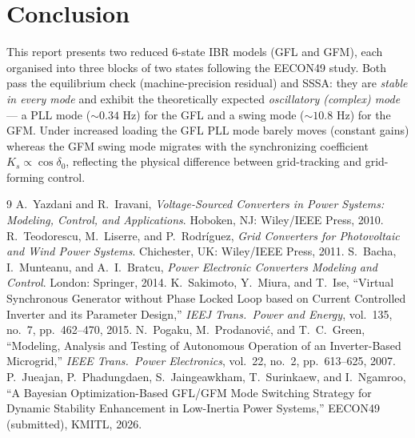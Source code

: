 \documentclass[12pt,a4paper]{article}
\begin{document}
\section{Conclusion}

This report presents two reduced 6-state IBR models (GFL and GFM), each organised into
three blocks of two states following the EECON49 study. Both pass the equilibrium check
(machine-precision residual) and SSSA: they are \emph{stable in every mode} and exhibit
the theoretically expected \emph{oscillatory (complex) mode} --- a PLL mode
($\sim0.34$ Hz) for the GFL and a swing mode ($\sim10.8$ Hz) for the GFM. Under
increased loading the GFL PLL mode barely moves (constant gains) whereas the GFM swing
mode migrates with the synchronizing coefficient $K_s\propto\cos\delta_0$, reflecting the
physical difference between grid-tracking and grid-forming control.

\begin{thebibliography}{9}
 A.~Yazdani and R.~Iravani, \emph{Voltage-Sourced Converters
in Power Systems: Modeling, Control, and Applications}. Hoboken, NJ: Wiley/IEEE
Press, 2010.
 R.~Teodorescu, M.~Liserre, and P.~Rodr\'iguez,
\emph{Grid Converters for Photovoltaic and Wind Power Systems}. Chichester, UK:
Wiley/IEEE Press, 2011.
 S.~Bacha, I.~Munteanu, and A.~I.~Bratcu, \emph{Power
Electronic Converters Modeling and Control}. London: Springer, 2014.
 K.~Sakimoto, Y.~Miura, and T.~Ise, ``Virtual Synchronous
Generator without Phase Locked Loop based on Current Controlled Inverter and its
Parameter Design,'' \emph{IEEJ Trans.\ Power and Energy}, vol.~135, no.~7,
pp.~462--470, 2015.
 N.~Pogaku, M.~Prodanovi\'c, and T.~C.~Green, ``Modeling,
Analysis and Testing of Autonomous Operation of an Inverter-Based Microgrid,''
\emph{IEEE Trans.\ Power Electronics}, vol.~22, no.~2, pp.~613--625, 2007.
 P.~Jueajan, P.~Phadungdaen, S.~Jaingeawkham, T.~Surinkaew, and
I.~Ngamroo, ``A Bayesian Optimization-Based GFL/GFM Mode Switching Strategy for
Dynamic Stability Enhancement in Low-Inertia Power Systems,'' EECON49 (submitted),
KMITL, 2026.
\end{thebibliography}
\end{document}
